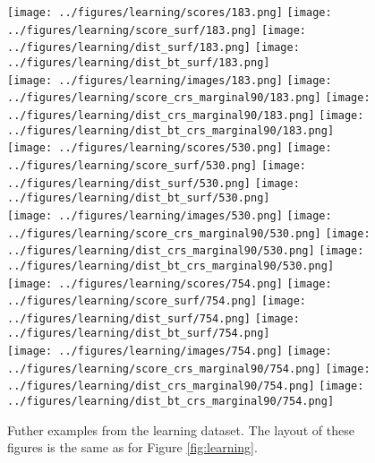 \begin{figure}
	\begin{center}
		\texttt{[image: ../figures/learning/scores/183.png]}
		\texttt{[image: ../figures/learning/score\_surf/183.png]}	\texttt{[image: ../figures/learning/dist\_surf/183.png]}
		\texttt{[image: ../figures/learning/dist\_bt\_surf/183.png]}\\
		\texttt{[image: ../figures/learning/images/183.png]}
		\texttt{[image: ../figures/learning/score\_crs\_marginal90/183.png]}
		\texttt{[image: ../figures/learning/dist\_crs\_marginal90/183.png]}
		\texttt{[image: ../figures/learning/dist\_bt\_crs\_marginal90/183.png]}\\
		\vspace{0.5cm}
		\texttt{[image: ../figures/learning/scores/530.png]}
		\texttt{[image: ../figures/learning/score\_surf/530.png]}	\texttt{[image: ../figures/learning/dist\_surf/530.png]}
		\texttt{[image: ../figures/learning/dist\_bt\_surf/530.png]}\\
		\texttt{[image: ../figures/learning/images/530.png]}
		\texttt{[image: ../figures/learning/score\_crs\_marginal90/530.png]}
		\texttt{[image: ../figures/learning/dist\_crs\_marginal90/530.png]}
		\texttt{[image: ../figures/learning/dist\_bt\_crs\_marginal90/530.png]}\\
		\vspace{0.5cm}
		\texttt{[image: ../figures/learning/scores/754.png]}
		\texttt{[image: ../figures/learning/score\_surf/754.png]}	\texttt{[image: ../figures/learning/dist\_surf/754.png]}
		\texttt{[image: ../figures/learning/dist\_bt\_surf/754.png]}\\
		\texttt{[image: ../figures/learning/images/754.png]}
		\texttt{[image: ../figures/learning/score\_crs\_marginal90/754.png]}
		\texttt{[image: ../figures/learning/dist\_crs\_marginal90/754.png]}
		\texttt{[image: ../figures/learning/dist\_bt\_crs\_marginal90/754.png]}
	\end{center}
	\caption{Futher examples from the learning dataset. The layout of these figures is the same as for Figure \ref{fig:learning}.}
	\label{fig:learning3}
\end{figure}


